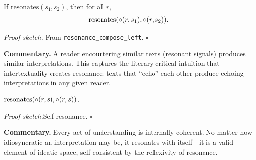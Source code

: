 \begin{theorem}
\label{thm:resonance_signal_preservation}
If $\text{resonates}(s_1, s_2)$, then for all $r$,
\[
  \text{resonates}(\circ(r, s_1), \circ(r, s_2)).
\]
\end{theorem}

\noindent\textit{Proof sketch.}\quad
From \texttt{resonance\_compose\_left}.
\hfill$\square$

\medskip

\noindent\textbf{Commentary.}
A reader encountering similar texts (resonant signals) produces similar
interpretations.  This captures the literary-critical intuition that
intertextuality creates resonance: texts that ``echo'' each other produce
echoing interpretations in any given reader.

\begin{theorem}
\label{thm:interpretation_self_resonance}
$\text{resonates}(\circ(r, s), \circ(r, s))$.
\end{theorem}

\noindent\textit{Proof sketch.}\quad Self-resonance. \hfill$\square$

\medskip

\noindent\textbf{Commentary.}
Every act of understanding is internally coherent.  No matter how
idiosyncratic an interpretation may be, it resonates with itself---it is
a valid element of ideatic space, self-consistent by the reflexivity of
resonance.

